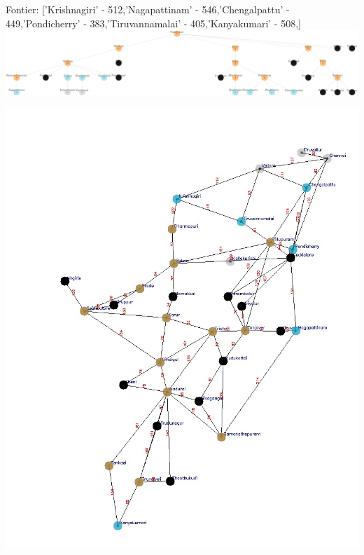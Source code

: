 \documentclass[xcolor=table]{beamer}
\begin{document}
\begin{frame}
  { \tiny Fontier: ['Krishnagiri' - 512,'Nagapattinam' - 546,'Chengalpattu' - 449,'Pondicherry' - 383,'Tiruvannamalai' - 405,'Kanyakumari' - 508,] }
  \includegraphics[width=1\textwidth]{../UCSNodes/36-1.png}
  \begin{center}
    \includegraphics[height=0.6\textheight]{../UCSoutput/tamilUCS37.jpg}
  \end{center}
\end{frame}
\end{document}
